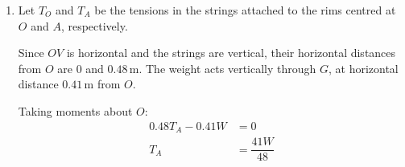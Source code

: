 \documentclass[leqno]{article}
\begin{document}
\begin{enumerate}[
  label=\textbf{\arabic*.},
  leftmargin=*,
  topsep=0pt,
  partopsep=0pt,
  parsep=0pt
]
\begin{djsSolution}
\begin{enumerate}[label=\textbf{(\alph*)}, start=1]
The centre of mass of a uniform solid cylinder lies halfway along its axis.
The centre of mass of a uniform solid hemisphere of radius \(R\) lies on its axis, a distance \(\frac38 R\) from its plane face towards the curved surface.
The centre of mass of a uniform solid cone of height \(H\) lies on its axis, a distance \(\frac14 H\) from its base towards its vertex.

Using mass \(=\) density \(\times\) volume:
\[
\begingroup
\renewcommand{\arraystretch}{1.65}
\setlength{\arraycolsep}{10pt}
\begin{array}{c|c|c}
\text{Component} & \text{Mass} & \text{Axial distance from }O \\
\hline
\text{Complete cylinder} & m_1=\rho\pi r^2(2r)=2\rho\pi r^3 & x_1=r \\
\text{Removed hemisphere} & m_2=\frac23\rho\pi r^3 & x_2=\frac{3r}{8} \\
\text{Cone} & m_3=\frac13\rho\pi r^2(2r)=\frac23\rho\pi r^3 & x_3=2r+\frac{2r}{4}=\frac{5r}{2}
\end{array}
\endgroup
\]

For a composite solid, the centre of mass satisfies
\[
M\bar{x}=\sum m_ix_i
\]

where \(M=\sum m_i\) is the total mass, with the mass of a removed piece counted as negative. Here \(\bar{x}=OG\), and the hemisphere is the removed piece, so
\[
(m_1-m_2+m_3)OG=m_1x_1-m_2x_2+m_3x_3
\]

Substituting and cancelling \(\rho\pi r^3\):
\begin{align*}
\left(2-\dfrac23+\dfrac23\right)OG
&=2r-\dfrac23\left(\dfrac{3r}{8}\right)+\dfrac23\left(\dfrac{5r}{2}\right) \\
OG&=\dfrac{r}{2}\left(2-\dfrac14+\dfrac53\right) \\
&=\dfrac{41r}{24} \\
&=\dfrac{41(0.24)}{24} \\
&=0.41\,\mathrm{m}
\end{align*}

\item Let \(T_O\) and \(T_A\) be the tensions in the strings attached to the rims centred at \(O\) and \(A\), respectively.

Since \(OV\) is horizontal and the strings are vertical, their horizontal distances from \(O\) are \(0\) and \(0.48\,\mathrm{m}\). The weight acts vertically through \(G\), at horizontal distance \(0.41\,\mathrm{m}\) from \(O\).

Taking moments about \(O\):
\begin{align*}
0.48T_A-0.41W&=0 \\
T_A&=\dfrac{41W}{48}
\end{align*}


\end{enumerate}
\end{djsSolution}
\end{enumerate}
\end{document}
